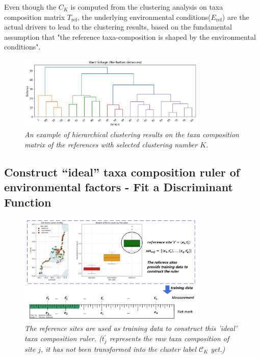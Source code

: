 Even though the \(C_K\) is computed from the clustering analysis on taxa composition matrix \(T_{\text{ref}}\),
the underlying environmental conditions(\(E_{\text{ref}}\)) are the actual drivers to lead to the clustering results,
based on the fundamental assumption that "the reference taxa-composition is shaped by the environmental conditions".

\begin{figure}[!h]
    \centering
    \includegraphics[width=0.8\textwidth]{../presentation/figures/p10_clustering_results.png}
    \caption{\textit{An example of hierarchical clustering results on the taxa composition matrix of the references
    with selected clustering number \(K\).}}
    \label{fig:p10_clustering_results}
\end{figure}


\subsection{Construct “ideal” taxa composition ruler of environmental factors - Fit a Discriminant Function}

\begin{figure}[!h]
\centering
\includegraphics[width=0.8\textwidth]{../results/ideas_visualization/constructing_ruler.png}
\caption{\textit{The reference sites are used as training data to construct this 'ideal' taxa composition ruler.
($t^{'}_{j}$ represents the raw taxa composition of site \(j\), it has not been transformed into the cluster label \(\mathcal{C}_K\) yet.)}}
\label{fig:constructing_ruler}
\end{figure}

